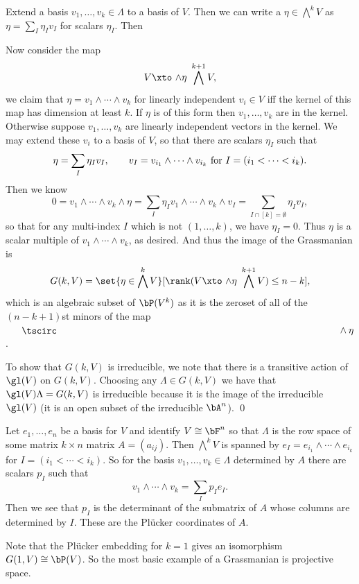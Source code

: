     Extend a basis $v_1,\dots,v_k\in\Lambda$ to a basis of $V$.
    Then we can write a $\eta\in\bigwedge^kV$ as $\eta=\sum_I\eta_Iv_I$ for scalars $\eta_I$.
    Then

    Now consider the map
    $$ V \xtos{\wedge\eta} \bigwedge^{k+1}V , $$
    we claim that $\eta=v_1\wedge\cdots\wedge v_k$ for linearly independent $v_i\in V$ iff the kernel
    of this map has dimension at least $k$.
    If $\eta$ is of this form then $v_1,\dots,v_k$ are in the kernel.
    Otherwise suppose $v_1,\dots,v_k$ are linearly independent vectors in the kernel.
    We may extend these $v_i$ to a basis of $V$, so that there are scalars $\eta_I$ such that
    $$ \eta = \sum_I\eta_Iv_I,\qquad v_I = v_{i_1}\wedge\cdots\wedge v_{i_k}\hbox{ for $I=(i_1<\cdots<i_k)$} . $$
    Then we know
    $$ 0 = v_1\wedge\cdots\wedge v_k\wedge\eta = \sum_I\eta_Iv_1\wedge\cdots\wedge v_k\wedge v_I
    = \sum_{I\cap[k]=\emptyset}\eta_Iv_I , $$
    so that for any multi-index $I$ which is not $(1,\dots,k)$, we have $\eta_I=0$.
    Thus $\eta$ is a scalar multiple of $v_1\wedge\cdots\wedge v_k$, as desired.
    And thus the image of the Grassmanian is
    $$ G(k,V) = \set{\eta\in\bigwedge^kV}[\rank(V\xtos{\wedge\eta}\bigwedge^{k+1}V)\leq n-k] , $$
    which is an algebraic subset of $\bP(V^k)$ as it is the zeroset of all of the $(n-k+1)$st minors of
    the map $\bul\wedge\eta$.

    To show that $G(k,V)$ is irreducible, we note that there is a transitive action of $\gl(V)$ on
    $G(k,V)$.
    Choosing any $\Lambda\in G(k,V)$ we have that $\gl(V)\Lambda=G(k,V)$ is irreducible because
    it is the image of the irreducible $\gl(V)$ (it is an open subset of the irreducible $\bA^n$).
    \qed

\eproof

Let $e_1,\dots,e_n$ be a basis for $V$ and identify $V\cong\bF^n$ so that
$\Lambda$ is the row space of some matrix $k\times n$ matrix $A=(a_{ij})$.
Then $\bigwedge^kV$ is spanned by $e_I=e_{i_1}\wedge\cdots\wedge e_{i_k}$ for $I=(i_1<\cdots<i_k)$.
So for the basis $v_1,\dots,v_k\in\Lambda$ determined by $A$ there are scalars $p_I$ such that
$$ v_1\wedge\cdots\wedge v_k = \sum_Ip_Ie_I . $$
Then we see that $p_I$ is the determinant of the submatrix of $A$ whose columns are determined by $I$.
These are the {\emphcolor Pl\"ucker coordinates} of $A$.

\bexam

    Note that the Pl\"ucker embedding for $k=1$ gives an isomorphism $G(1,V)\cong\bP(V)$.
    So the most basic example of a Grassmanian is projective space.

